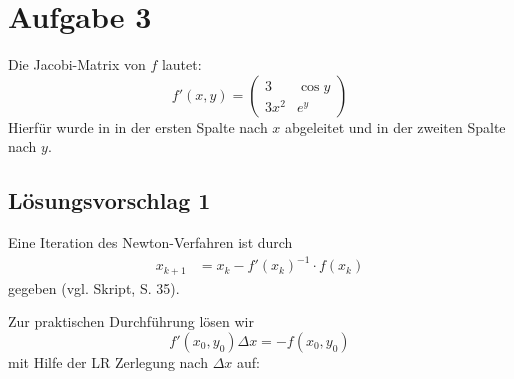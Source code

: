 \section*{Aufgabe 3}
Die Jacobi-Matrix von $f$ lautet:
\[f' (x,y) = \begin{pmatrix}
	3     & \cos y\\
	3 x^2 & e^y
\end{pmatrix}\]
Hierfür wurde in in der ersten Spalte nach $x$ abgeleitet und in der
zweiten Spalte nach $y$.

\subsection*{Lösungsvorschlag 1}
Eine Iteration des Newton-Verfahren ist durch
\begin{align}
x_{k+1}&=x_{k}-f'(x_k)^{-1}\cdot f(x_k)
\end{align}
gegeben (vgl. Skript, S. 35).

Zur praktischen Durchführung lösen wir
\[f'(x_0, y_0)\Delta x = -f(x_0,y_0)\]
mit Hilfe der LR Zerlegung nach $\Delta x$ auf:

